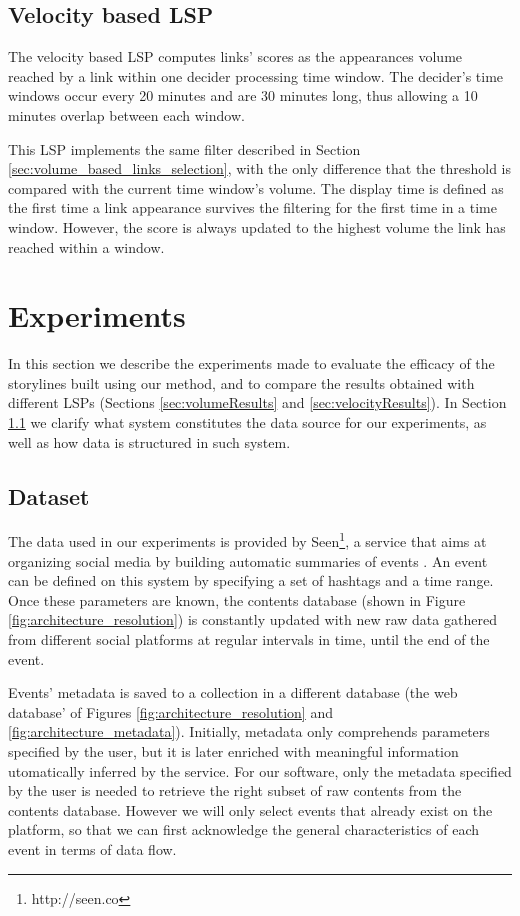 \documentclass{sig-alternate}
\begin{document}
\subsection{Velocity based LSP}
\label{sec:velocity_based_links_selection}
The velocity based LSP computes links' scores as the appearances volume reached by a link within one decider processing time window. The decider's time windows occur every 20 minutes and are 30 minutes long, thus allowing a 10 minutes overlap between each window.

This LSP implements the same filter described in Section \ref{sec:volume_based_links_selection}, with the only difference that the threshold is compared with the current time window's volume. The display time is defined as the first time a link appearance survives the filtering for the first time in a time window. However, the score is always updated to the highest volume the link has reached within a window.


\section{Experiments}
\label{sec:experiment}
In this section we describe the experiments made to evaluate the efficacy of the storylines built using our method, and to compare the results obtained with different LSPs (Sections \ref{sec:volumeResults} and \ref{sec:velocityResults}). In Section \ref{sec:dataset} we clarify what system constitutes the data source for our experiments, as well as how data is structured in such system.

\subsection{Dataset}
\label{sec:dataset}
The data used in our experiments is provided by Seen\footnote{http://seen.co}, a service that aims at organizing social media by building automatic summaries of events \cite{SeenWired}. An event can be defined on this system by specifying a set of hashtags and a time range. Once these parameters are known, the contents database (shown in Figure \ref{fig:architecture_resolution}) is constantly updated with new raw data gathered from different social platforms at regular intervals in time, until the end of the event.

Events' metadata is saved to a collection in a different database (the web database' of Figures \ref{fig:architecture_resolution} and \ref{fig:architecture_metadata}). Initially, metadata only comprehends parameters specified by the user, but it is later enriched with meaningful information utomatically inferred by the service. For our software, only the metadata specified by the user is needed to retrieve the right subset of raw contents from the contents database. However we will only select events that already exist on the platform, so that we can first acknowledge the general characteristics of each event in terms of data flow.
\end{document}
